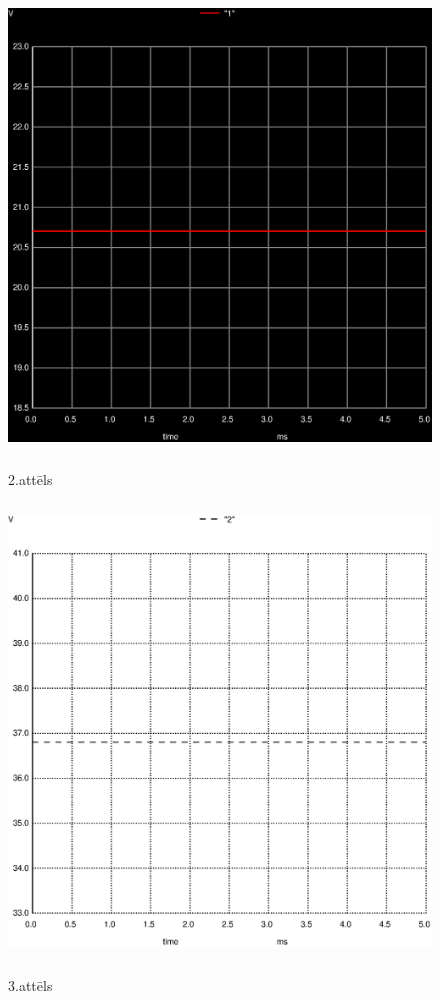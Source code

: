 \documentclass {report}
\begin{document}
\begin{figure}
    \includegraphics[width=12cm,height=12cm,keepaspectratio]{011.ps}  \\
\caption{2.attēls}
\label{i:example}
\end{figure}
\begin{figure}
    \includegraphics[width=12cm,height=12cm,keepaspectratio]{022.ps}  \\
  \caption{3.attēls}
\label{i:example}
\end{figure}
  
\end{document}
